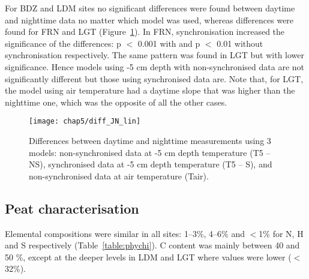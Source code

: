 For BDZ and LDM sites no significant differences were found between daytime and nighttime data no matter which model was used, whereas differences were found for FRN and LGT (Figure~\ref{fig:diff_JN}). 
In FRN, synchronisation increased the significance of the differences: p $<$ 0.001 with and p $<$ 0.01 without synchronisation respectively.
The same pattern was found in LGT but with lower significance.
Hence models using -5 cm depth with non-synchronised data are not significantly different but those using synchronised data are.
Note that, for LGT, the model using air temperature had a daytime slope that was higher than the nighttime one, which was the opposite of all the other cases.

\begin{figure}
\centering
\texttt{[image: chap5/diff\_JN\_lin]}
\caption{Differences between daytime and nighttime measurements using 3 models: non-synchronised data at -5 cm depth temperature (T5 -- NS), synchronised data at -5 cm depth temperature (T5 -- S), and non-synchronised data at air temperature (Tair).}
\label{fig:diff_JN}
\end{figure}

\subsection{Peat characterisation}

Elemental compositions were similar in all sites: 1--3\%, 4--6\% and $<$1\% for N, H and S respectively (Table~\ref{table:phychi}).
C content was mainly between 40 and 50 \%, except at the deeper levels in LDM and LGT where values were lower ($<$ 32\%).

